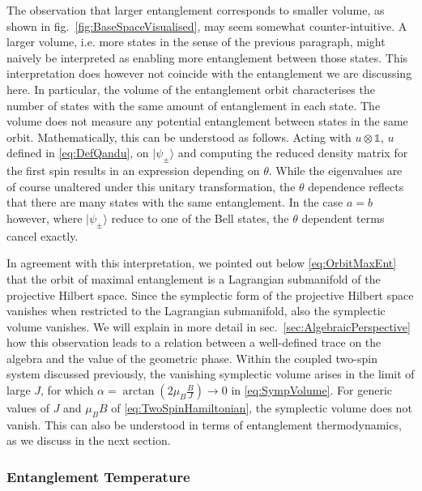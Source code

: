 \documentclass[a4paper,11pt]{article}
\newcommand{\1}{\mathds{1}}
\begin{document}
The observation that larger entanglement corresponds to smaller volume, as shown in fig.~\ref{fig:BaseSpaceVisualised}, may seem somewhat counter-intuitive. A larger volume, i.e. more states in the sense of the previous paragraph, might naively be interpreted as enabling more entanglement between those states. This interpretation does however not coincide with the entanglement we are discussing here. In particular, the volume of the entanglement orbit characterises the number of states with the same amount of entanglement in each state. The volume does not measure any potential entanglement between states in the same orbit. Mathematically, this can be understood as follows. Acting with $u\otimes\1$, $u$ defined in \eqref{eq:DefQandu}, on $|\psi_\pm\rangle$ and computing the reduced density matrix for the first spin results in an expression depending on $\theta$. While the eigenvalues are of course unaltered under this unitary transformation, the $\theta$ dependence reflects that there are many states with the same entanglement. In the case $a=b$ however, where $|\psi_\pm\rangle$ reduce to one of the Bell states, the $\theta$ dependent terms cancel exactly. 

In agreement with this interpretation, we pointed out below \eqref{eq:OrbitMaxEnt} that the orbit of maximal entanglement is a Lagrangian submanifold of the projective Hilbert space. Since the symplectic form of the projective Hilbert space vanishes when restricted to the Lagrangian submanifold, also the symplectic volume vanishes. We will explain in more detail in sec.~\ref{sec:AlgebraicPerspective} how this observation leads to a relation between  a well-defined trace on the algebra and the value of the geometric phase. Within the coupled two-spin system discussed previously, the vanishing symplectic volume arises in the limit of large $J$, for which $\alpha=\arctan(2\mu_B\frac{B}{J})\to0$ in \eqref{eq:SympVolume}. For generic values of $J$ and $\mu_BB$ of \eqref{eq:TwoSpinHamiltonian}, the symplectic volume does not vanish. This can also be understood in terms of entanglement thermodynamics, as we discuss in the next section.

\subsubsection{Entanglement Temperature}
\label{sec:EntanglementTemperature}
\end{document}
